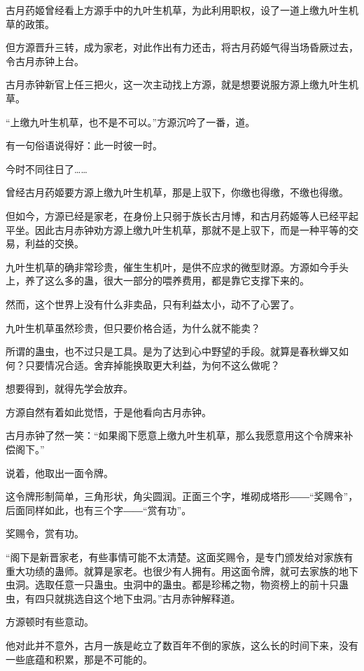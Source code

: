 
\begin{this_body}

古月药姬曾经看上方源手中的九叶生机草，为此利用职权，设了一道上缴九叶生机草的政策。

但方源晋升三转，成为家老，对此作出有力还击，将古月药姬气得当场昏厥过去，令古月赤钟上台。

古月赤钟新官上任三把火，这一次主动找上方源，就是想要说服方源上缴九叶生机草。

“上缴九叶生机草，也不是不可以。”方源沉吟了一番，道。

有一句俗语说得好：此一时彼一时。

今时不同往日了……

曾经古月药姬要方源上缴九叶生机草，那是上驭下，你缴也得缴，不缴也得缴。

但如今，方源已经是家老，在身份上只弱于族长古月博，和古月药姬等人已经平起平坐。因此古月赤钟劝方源上缴九叶生机草，那就不是上驭下，而是一种平等的交易，利益的交换。

九叶生机草的确非常珍贵，催生生机叶，是供不应求的微型财源。方源如今手头上，养了这么多的蛊，很大一部分的喂养费用，都是靠它支撑下来的。

然而，这个世界上没有什么非卖品，只有利益太小，动不了心罢了。

九叶生机草虽然珍贵，但只要价格合适，为什么就不能卖？

所谓的蛊虫，也不过只是工具。是为了达到心中野望的手段。就算是春秋蝉又如何？只要情况合适。舍弃掉能换取更大利益，为何不这么做呢？

想要得到，就得先学会放弃。

方源自然有着如此觉悟，于是他看向古月赤钟。

古月赤钟了然一笑：“如果阁下愿意上缴九叶生机草，那么我愿意用这个令牌来补偿阁下。”

说着，他取出一面令牌。

这令牌形制简单，三角形状，角尖圆润。正面三个字，堆砌成塔形――“奖赐令”，后面同样如此，也有三个字――“赏有功”。

奖赐令，赏有功。

“阁下是新晋家老，有些事情可能不太清楚。这面奖赐令，是专门颁发给对家族有重大功绩的蛊师。就算是家老。也很少有人拥有。用这面令牌，就可去家族的地下虫洞。选取任意一只蛊虫。虫洞中的蛊虫。都是珍稀之物，物资榜上的前十只蛊虫，有四只就挑选自这个地下虫洞。”古月赤钟解释道。

方源顿时有些意动。

他对此并不意外，古月一族是屹立了数百年不倒的家族，这么长的时间下来，没有一些底蕴和积累，那是不可能的。


\end{this_body}
